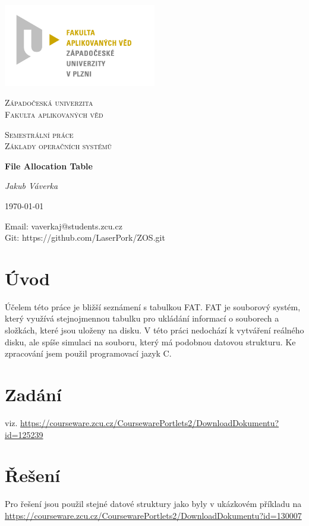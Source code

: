 \documentclass[12pt, a4paper]{article}
\begin{document}
\begin{titlepage}
	\centering
	\includegraphics[width=0.5\textwidth]{FAV_logo_jvs.jpg}\par\vspace{1cm}
	{\scshape\LARGE Západočeská univerzita \\ Fakulta aplikovaných věd\par}
	\vspace{1cm}
	{\scshape\Large Semestrální práce \\Základy operačních systémů\par}
	\vspace{1.5cm}
	{\huge\bfseries File Allocation Table\par}
	\vspace{2cm}
	{\Large\itshape Jakub Váverka\par}
	\vfill

	{\large \today\par}
	\vspace{2cm}
\begin{flushleft}
\small{
Email: vaverkaj@students.zcu.cz \\
}
\small{
Git: https://github.com/LaserPork/ZOS.git
}
\end{flushleft}
\end{titlepage}
\section{Úvod}
Účelem této práce je bližší seznámení s tabulkou FAT. FAT je souborový systém, který využívá stejnojmennou tabulku pro ukládání informací o souborech a složkách, které jsou uloženy na disku. V této práci nedochází k vytváření reálného disku, ale spíše simulaci na souboru, který má podobnou datovou strukturu. Ke zpracování jsem použil programovací jazyk C.
\section{Zadání}
viz. 
\url{
https://courseware.zcu.cz/CoursewarePortlets2/DownloadDokumentu?id=125239
}

\section{Řešení}
Pro řešení jsou použil stejné datové struktury jako byly v ukázkovém příkladu na
\url{
https://courseware.zcu.cz/CoursewarePortlets2/DownloadDokumentu?id=130007 
}
\end{document}
